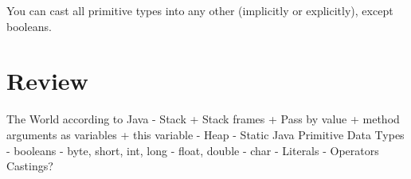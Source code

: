 \documentclass[8pt, a4paper, oneside]{extarticle}
\begin{document}
You can cast all primitive types into any other (implicitly or explicitly),
except booleans.

\section{Review}

\begin{blackboard}
The World according to Java
  - Stack
    + Stack frames
    + Pass by value
    + method arguments as variables
    + this variable
  - Heap
  - Static
Java Primitive Data Types
  - booleans
  - byte, short, int, long
  - float, double
  - char
  - Literals
  - Operators
Castings?
\end{blackboard}
\end{document}
